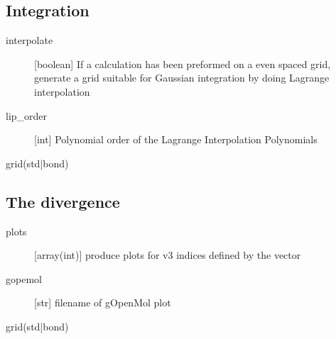 \documentclass[a4paper,11pt]{article}
\begin{document}
\subsection{Integration}

\begin{description}
  \item[interpolate] [boolean] If a calculation has been preformed on a even
	spaced grid, generate a grid suitable for Gaussian integration by doing
	Lagrange interpolation
  \item[lip\_order] [int] Polynomial order of the Lagrange Interpolation
	Polynomials
  \item[grid(std|bond)] 
\end{description}

\subsection{The divergence}

\begin{description}
  \item[plots] [array(int)] produce plots for v3 indices defined by the vector
  \item[gopemol] [str] filename of gOpenMol plot
  \item[grid(std|bond)] 
\end{description}
\end{document}
